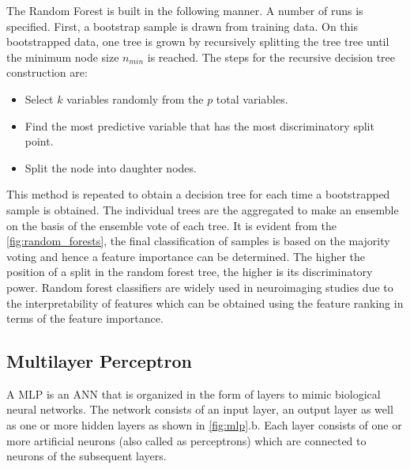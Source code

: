 \documentclass[msthesis.tex]{subfiles}
\begin{document}
The Random Forest is built in the following manner. A number of runs is specified. First, a bootstrap sample is drawn from training data. On this bootstrapped data, one tree is grown by recursively splitting the tree tree until the minimum node size $n_{min}$ is reached. The steps for the recursive decision tree construction are:
\begin{itemize}
    \item Select $k$ variables randomly from the $p$ total variables.
    \item Find the most predictive variable that has the most discriminatory split point.
    \item Split the node into daughter nodes.

\end{itemize}
This method is repeated to obtain a decision tree for each time a bootstrapped sample is obtained. The individual trees are the aggregated to make an ensemble on the basis of the ensemble vote of each tree. It is evident from the \cref{fig:random_forests}, the final classification of samples is based on the majority voting and hence a feature importance can be determined. The higher the position of a split in the random forest tree, the higher is its discriminatory power. Random forest classifiers are widely used in neuroimaging studies due to the interpretability of features which can be obtained using the feature ranking in terms of the feature importance. 

\subsection{Multilayer Perceptron}
A \gls{MLP} is an \gls{ANN} that is organized in the form of layers to mimic biological neural networks. The network consists of an input layer, an output layer as well as one or more hidden layers as shown in \cref{fig:mlp}.b. Each layer consists of one or more artificial neurons (also called as perceptrons) which are connected to neurons of the subsequent layers. 
\end{document}
